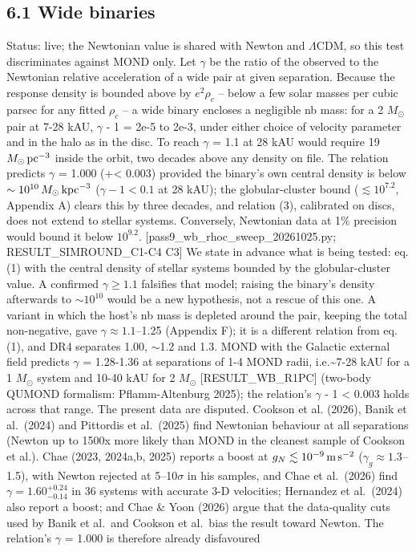 \documentclass[
  10pt,
]{article}
\begin{document}
\subsection{6.1 Wide binaries}

Status: live; the Newtonian value is shared with Newton and $\Lambda$CDM, so this test discriminates against MOND only. Let $\gamma$ be the ratio of the observed to the
Newtonian relative acceleration of a wide pair at given separation.
Because the response density is bounded above by $e^2\rho_c$ -- below
a few solar masses per cubic parsec for any fitted $\rho_c$ -- a wide
binary encloses a negligible nb mass: for a 2 $M_\odot$ pair at 7-28 kAU,
$\gamma$ - 1 = 2e-5 to 2e-3, under either choice of velocity parameter and
in the halo as in the disc. To reach $\gamma$ = 1.1 at 28 kAU would require
19 $M_\odot\,{\rm pc}^{-3}$ inside the orbit, two decades above any density on
file. The relation predicts $\gamma$ = 1.000 (+\textless{} 0.003) provided the binary's own central density is below $\sim10^{10}\,M_\odot\,{\rm kpc}^{-3}$ ($\gamma-1<0.1$ at 28 kAU); the globular-cluster bound ($\lesssim10^{7.2}$, Appendix A) clears this by three decades, and relation (3), calibrated on discs, does not extend to stellar systems. Conversely, Newtonian data at 1\% precision would bound it below $10^{9.2}$. {[}pass9\_wb\_rhoc\_sweep\_20261025.py; RESULT\_SIMROUND\_C1-C4 C3{]} We state in advance what is being tested: eq. (1) with the central density of stellar systems bounded by the globular-cluster value. A confirmed $\gamma\ge1.1$ falsifies that model; raising the binary's density afterwards to $\sim10^{10}$ would be a new hypothesis, not a rescue of this one. A variant in which the host's nb mass is depleted around the pair, keeping the total non-negative, gave $\gamma\approx1.1$--1.25 (Appendix F); it is a different relation from eq. (1), and DR4 separates 1.00, $\sim$1.2 and 1.3. MOND with the
Galactic external field predicts $\gamma$ = 1.28-1.36 at separations of 1-4
MOND radii, i.e.\textasciitilde{}7-28 kAU for a 1 $M_\odot$ system and 10-40 kAU for 2 $M_\odot$
{[}RESULT\_WB\_R1PC{]} (two-body QUMOND formalism: Pflamm-Altenburg
2025); the relation's $\gamma$ - 1 \textless{} 0.003 holds across that range.
The present data are disputed. Cookson et al. (2026), Banik et
al.~(2024) and Pittordis et al.~(2025) find Newtonian behaviour at all
separations (Newton up to 1500x more likely than MOND in the cleanest
sample of Cookson et al.). Chae (2023, 2024a,b, 2025) reports a boost at $g_N\lesssim10^{-9}\,{\rm m\,s^{-2}}$ ($\gamma_g\approx1.3$--1.5), with Newton rejected at 5--10$\sigma$ in his samples, and Chae et al.~(2026) find $\gamma=1.60^{+0.24}_{-0.14}$ in 36 systems with accurate 3-D velocities; Hernandez et al.~(2024) also report a boost; and Chae \& Yoon (2026) argue that the data-quality cuts used by Banik et al.~and Cookson et al.~bias the result toward Newton. The relation's $\gamma$ = 1.000 is therefore already disfavoured
\end{document}
